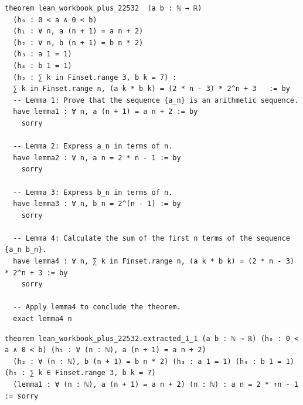 \begin{tcolorbox}[colback=lightblue, boxrule=0pt, arc=5pt, outer arc=5pt, after skip=10pt plus 2pt]
\begin{lstlisting}[caption={Example of a proof sketch},label={lst:sketch-example}, captionpos=t, language=lean, breaklines=true, style=mystyle]
theorem lean_workbook_plus_22532  (a b : ℕ → ℝ)
  (h₀ : 0 < a ∧ 0 < b)
  (h₁ : ∀ n, a (n + 1) = a n + 2)
  (h₂ : ∀ n, b (n + 1) = b n * 2)
  (h₃ : a 1 = 1)
  (h₄ : b 1 = 1)
  (h₅ : ∑ k in Finset.range 3, b k = 7) :
  ∑ k in Finset.range n, (a k * b k) = (2 * n - 3) * 2^n + 3   := by
  -- Lemma 1: Prove that the sequence {a_n} is an arithmetic sequence.
  have lemma1 : ∀ n, a (n + 1) = a n + 2 := by
    sorry

  -- Lemma 2: Express a_n in terms of n.
  have lemma2 : ∀ n, a n = 2 * n - 1 := by
    sorry

  -- Lemma 3: Express b_n in terms of n.
  have lemma3 : ∀ n, b n = 2^(n - 1) := by
    sorry

  -- Lemma 4: Calculate the sum of the first n terms of the sequence {a_n b_n}.
  have lemma4 : ∀ n, ∑ k in Finset.range n, (a k * b k) = (2 * n - 3) * 2^n + 3 := by
    sorry

  -- Apply lemma4 to conclude the theorem.
  exact lemma4 n
\end{lstlisting}
\end{tcolorbox}

\begin{tcolorbox}[colback=lightblue, boxrule=0pt, arc=5pt, outer arc=5pt, after skip=10pt plus 2pt]
\begin{lstlisting}[caption={Example of an extracted theorem},label={lst:extractgoal-example}, captionpos=t, language=lean, breaklines=true, style=mystyle]
theorem lean_workbook_plus_22532.extracted_1_1 (a b : ℕ → ℝ) (h₀ : 0 < a ∧ 0 < b) (h₁ : ∀ (n : ℕ), a (n + 1) = a n + 2)
  (h₂ : ∀ (n : ℕ), b (n + 1) = b n * 2) (h₃ : a 1 = 1) (h₄ : b 1 = 1) (h₅ : ∑ k ∈ Finset.range 3, b k = 7)
  (lemma1 : ∀ (n : ℕ), a (n + 1) = a n + 2) (n : ℕ) : a n = 2 * ↑n - 1 := sorry
\end{lstlisting}
\end{tcolorbox}


